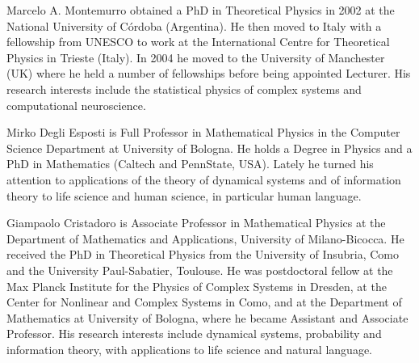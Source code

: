 \documentclass[journal]{IEEEtran}
\begin{document}
\begin{IEEEbiography}{Marcelo A. Montemurro} obtained a
PhD in Theoretical Physics in 2002 at the National University of C\'ordoba
(Argentina). He then moved to Italy with a fellowship from UNESCO to work at the
International Centre for Theoretical Physics in Trieste (Italy). In 2004 he
moved to the University of Manchester (UK) where he held a number of fellowships
before being appointed Lecturer. His research interests include the statistical
physics of complex systems and computational neuroscience.
\end{IEEEbiography}

\begin{IEEEbiography}{Mirko Degli Esposti} is Full
Professor in Mathematical Physics in the Computer Science Department
at University of Bologna. He holds a Degree
in Physics and a PhD in Mathematics (Caltech and
PennState, USA). Lately he turned his
attention to applications of the theory of dynamical systems and of information theory to life science and human science, in particular human language.
\end{IEEEbiography}

\begin{IEEEbiography}{Giampaolo Cristadoro}
is Associate Professor in Mathematical Physics at the
Department of Mathematics and Applications, University of
Milano-Bicocca. He received the PhD in Theoretical Physics from the University
of Insubria, Como and the University Paul-Sabatier, Toulouse.
He was postdoctoral fellow at the Max Planck Institute for the Physics of Complex Systems in Dresden, at the Center for Nonlinear and Complex Systems in Como, and at the Department of Mathematics at University of Bologna, where he became Assistant and Associate Professor.
His research interests include dynamical systems, probability and information theory, with applications to life science and natural language.
\end{IEEEbiography}
\end{document}
